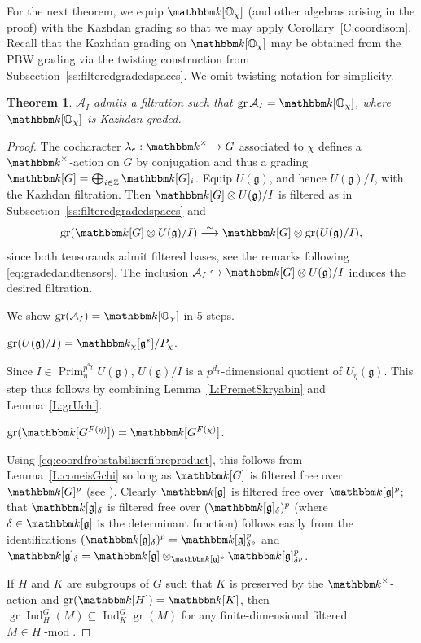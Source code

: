 \documentclass[twoside,12pt,reqno]{amsart}
\newtheorem{Theorem}{Theorem}[section]
\theoremstyle{remark}
\numberwithin{equation}{section}
\def\isoto{\overset{\sim}{\longrightarrow}}
\def\k{{\mathbbm k}}
\def\lmod{\!\operatorname{-mod}}
\def\gr{\operatorname{gr}}
\def\Ind{\operatorname{Ind}}
\def\Prim{\operatorname{Prim}}
\def\Z{{\mathbb Z}}
\def\O{{\mathbb O}}
\def\g{{\mathfrak g}}
\def\cA{\mathcal{A}}
\newcommand{\A}{\mathcal{A}}
\begin{document}
For the next theorem, we equip $\k[\O_\chi]$ (and other algebras arising in the proof) with the Kazhdan grading so that we may apply Corollary~\ref{C:coordisom}. Recall that the Kazhdan grading on $\k[\O_\chi]$ may be obtained from the PBW grading via the twisting construction from Subsection~\ref{ss:filteredgradedspaces}. We omit twisting notation for simplicity.
\begin{Theorem}\label{T:grAI}
    $\A_I$ admits a filtration such that $\gr \A_I = \k[\O_\chi]$, where $\k[\O_\chi]$ is Kazhdan graded.
\end{Theorem}
\begin{proof}
    The cocharacter $\lambda_e:\k^\times\to G$ associated to $\chi$ defines a $\k^\times$-action on $G$ by conjugation and thus a grading $\k[G]=\bigoplus_{i\in\Z}\k[G]_i$. Equip $U(\g)$, and hence $U(\g)/I$, with the Kazhdan filtration. Then $\k[G]\otimes U(\g)/I$ is filtered as in Subsection~\ref{ss:filteredgradedspaces} and $$\gr(\k[G]\otimes U(\g)/I)\isoto \k[G]\otimes \gr(U(\g)/I),$$ since both tensorands admit filtered bases, see the remarks following \eqref{eq:gradedandtensors}. The inclusion $\cA_I\hookrightarrow \k[G]\otimes U(\g)/I$ induces the desired filtration.

    We show $\gr(\cA_I)=\k[\O_\chi]$ in 5 steps.

     $\gr(U(\g)/I)=\k_\chi[\g^*]/P_\chi$.

    Since $I\in\Prim_{\eta}^{p^{{d_\chi}}} U(\g)$, $U(\g)/I$ is a $p^{d_\chi}$-dimensional quotient of $U_\eta(\g)$. This step thus follows by combining Lemma~\ref{L:PremetSkryabin} and Lemma~\ref{L:grUchi}. 

     $\gr(\k[G^{F(\eta)}])=\k[G^{F(\chi)}]$.

    Using \eqref{eq:coordfrobstabiliserfibreproduct}, this follows from Lemma~\ref{L:coneisGchi} so long as $\k[G]$ is filtered free over $\k[G]^p$ (see \cite[Lemma I.8.2]{NVO}). Clearly $\k[\g]$ is filtered free over $\k[\g]^p$; that $\k[\g]_\delta$ is filtered free over $(\k[\g]_\delta)^p$ (where $\delta\in\k[\g]$ is the determinant function) follows easily from the identifications $(\k[\g]_\delta)^p=\k[\g]^p_{\delta^p}$ and $\k[\g]_\delta=\k[\g]\otimes_{\k[\g]^p}\k[\g]^p_{\delta^p}$.

     If $H$ and $K$ are subgroups of $G$ such that $K$ is preserved by the $\k^\times$-action and $\gr(\k[H])=\k[K]$, then $\gr\Ind_H^G(M)\subseteq \Ind_K^G\gr(M)$ for any finite-dimensional filtered $M\in H\lmod$.


\end{proof}
\end{document}
